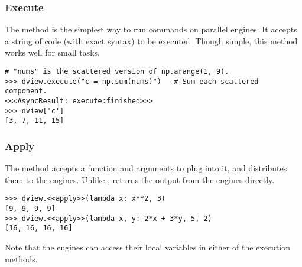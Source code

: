 
\subsubsection*{Execute} %

The  method is the simplest way to run commands on parallel engines.
It accepts a string of code (with exact syntax) to be executed.
Though simple, this method works well for small tasks.

\begin{lstlisting}
# "nums" is the scattered version of np.arange(1, 9).
>>> dview.execute("c = np.sum(nums)")   # Sum each scattered component.
<<<AsyncResult: execute:finished>>>
>>> dview['c']
[3, 7, 11, 15]
\end{lstlisting}

\subsubsection*{Apply} %

The  method accepts a function and arguments to plug into it, and distributes them to the engines.
Unlike ,  returns the output from the engines directly.

\begin{lstlisting}
>>> dview.<<apply>>(lambda x: x**2, 3)
[9, 9, 9, 9]
>>> dview.<<apply>>(lambda x, y: 2*x + 3*y, 5, 2)
[16, 16, 16, 16]
\end{lstlisting}

Note that the engines can access their local variables in either of the execution methods.

